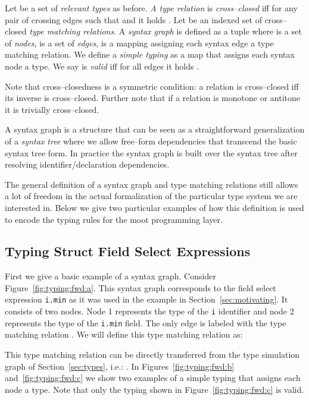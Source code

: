 \documentclass{sigplanconf}
\newcommand{\concept}[1]{\emph{#1}}
\begin{document}
\begin{definition}\label{def:syntax_graphs}
Let  be a set of \emph{relevant types} as before. \emph{A type
  relation}  is \emph{cross--closed} iff for
any pair of crossing edges  such that  and  it holds . Let
 be an indexed set of cross--closed
\emph{type matching relations}.
A \concept{syntax graph}  is
defined as a tuple  where  is a
set of \concept{nodes},  is a set of
\concept{edges},  is a mapping assigning each
syntax edge a type matching relation. We define a \concept{simple
  typing}  as a map that assigns each syntax node a
type. We say  is \emph{valid} iff for all edges 
it holds .
\end{definition}

Note that cross--closedness is a symmetric condition: a relation is
cross--closed iff its inverse is cross--closed. Further note that if a
relation is monotone or antitone it is trivially cross--closed.

A syntax graph is a structure that can be seen as a straightforward
generalization of a \concept{syntax tree} where we allow free--form
dependencies that transcend the basic syntax tree form. In practice
the syntax graph is built over the syntax tree after resolving
identifier/declaration dependencies.

The general definition of a syntax graph and type matching relations
still allows a lot of freedom in the actual formalization of the
particular type system we are interested in. Below we give two
particular examples of how this definition is used to encode the
typing rules for the {\sc moot} programming layer.

\subsection{Typing Struct Field Select Expressions}

First we give a basic example of a syntax graph. Consider
Figure~\ref{fig:typing:fwd:a}. This syntax graph corresponds to the
field select expression \verb+i.min+ as it was used in the example in
Section~\ref{sec:motivating}. It consists of two nodes. Node 1
represents the type of the \verb+i+ identifier and node 2 represents
the type of the \verb+i.min+ field. The only edge is labeled with the
type matching relation . We will define this type matching
relation as:

This type matching relation can be directly transferred from the type
simulation graph of Section~\ref{sec:types}, i.e.: .
In Figures~\ref{fig:typing:fwd:b} and~\ref{fig:typing:fwd:c} we show two
examples of a simple typing that assigns each node a type. Note that
only the typing shown in Figure~\ref{fig:typing:fwd:c} is valid.
\end{document}
